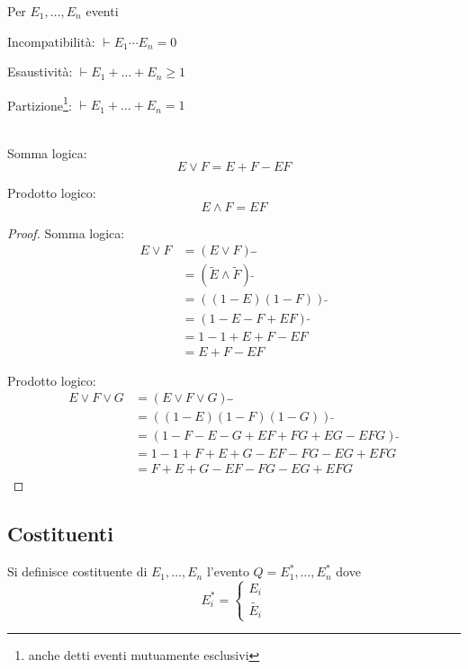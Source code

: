 \begin{definition}
  Per \( E_1, \ldots, E_n \) eventi
  
  Incompatibilità: \( \vdash E_1  \cdots E_n = 0 \)

  Esaustività: \( \vdash E_1 + \ldots + E_n \geq 1 \)

  Partizione\footnote{anche detti eventi mutuamente esclusivi}: \( \vdash E_1 + \ldots + E_n = 1 \)
\end{definition}

\begin{proposition}{\ \\}
  Somma logica:
  \[ E \vee F = E + F - EF \]

  Prodotto logico:
  \[ E \wedge F = EF \]
\end{proposition}
\begin{proof}
  Somma logica:
  \begin{equation*}
    \begin{split}
      E \vee F &= (E \vee F) ~ \tilde{} ~ \tilde{} \\
      &= (\tilde{E} \wedge \tilde{F}) ~ \tilde{} \\
      &= ((1-E)(1-F)) ~ \tilde{} \\
      &= (1 - E - F + EF) ~ \tilde{} \\
      &= 1 - 1 + E + F - EF \\
      &= E + F - EF
    \end{split}
  \end{equation*}

  Prodotto logico:
  \begin{equation*}
    \begin{split}
      E \vee F \vee G &= (E \vee F \vee G) ~ \tilde{} ~ \tilde{} \\
      &= ((1 - E)(1 - F)(1 - G)) ~ \tilde{} \\
      &= (1 - F - E - G + EF + FG + EG - EFG) ~ \tilde{} \\
      &= 1 - 1 + F + E + G - EF - FG - EG + EFG \\
      &= F + E + G - EF - FG - EG + EFG
    \end{split}
  \end{equation*}
\end{proof}

\subsection{Costituenti}
\begin{definition}[Costituente]
  Si definisce costituente di \( E_1, \ldots, E_n \) l'evento \( Q = E_1^*, \ldots, E_n^* \) dove
  \begin{equation*}
    E_i^* =
    \begin{cases}
      E_i \\
      \tilde{E_i}
    \end{cases}
  \end{equation*}
\end{definition}

